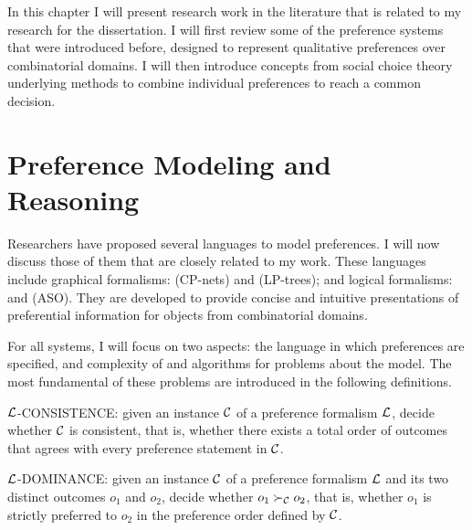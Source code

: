 
In this chapter I will present research work in the literature 
that is related to my research for the dissertation.
I will first review some of the preference
systems that were introduced before, designed to represent
qualitative preferences over combinatorial domains. 
I will then introduce concepts
from social choice theory underlying methods to
combine individual preferences to reach a common decision.

\section{Preference Modeling and Reasoning \label{sec:pref_reasoning}}
Researchers have proposed several languages to model preferences.
I will now discuss those of them that are closely related
to my work.
These languages include graphical formalisms:
 (CP-nets) and
 (LP-trees);
and logical formalisms:
 and
 (ASO).
They are developed to provide concise and intuitive
presentations of preferential information for objects from
combinatorial domains.

For all systems, I will focus on two aspects:
the language in which preferences are specified,
and complexity of and algorithms for
problems about the model.
The most fundamental of these problems are introduced
in the following definitions.

\begin{definition}
\label{def:con}
  $\mathcal{L}$-CONSISTENCE: given an instance $\mathcal{C}$ of a preference
	formalism $\mathcal{L}$, decide whether $\mathcal{C}$ is consistent, that is,
  whether there exists a total order of outcomes that agrees with every
	preference statement in $\mathcal{C}$.
\end{definition}

\begin{definition}
\label{def:dom}
  $\mathcal{L}$-DOMINANCE: given an instance $\mathcal{C}$ of a preference
	formalism $\mathcal{L}$ and its two distinct outcomes
  $o_1$ and $o_2$, decide whether $o_1 \succ_{\mathcal{C}} o_2$, that is,
  whether $o_1$ is strictly preferred to $o_2$ in 
	the preference order defined by $\mathcal{C}$.
\end{definition}

